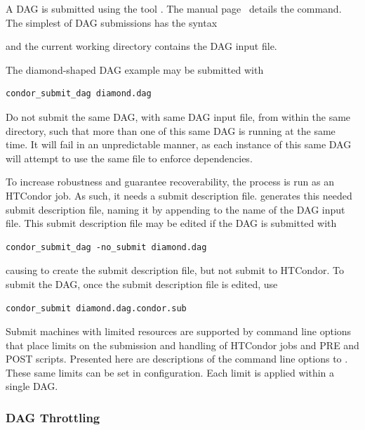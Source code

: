 A DAG is submitted using the tool .
The manual
page~\pageref{man-condor-submit-dag}
details the command.
The simplest of DAG submissions has the syntax

 

and the current working directory contains the DAG input file.

The diamond-shaped DAG example may be submitted with

\begin{verbatim}
condor_submit_dag diamond.dag
\end{verbatim}

Do not submit the same DAG, with same DAG input file, 
from within the same directory, 
such that more than one of this same DAG is running at the same time.
It will fail in an unpredictable manner,
as each instance of this same DAG will attempt to use the same
file to enforce dependencies.
 
To increase robustness and guarantee recoverability, the 
 process is run as an HTCondor job.
As such, it needs a submit description file.
 generates this needed submit description file,
naming it by appending  to the name of the DAG input file.
This submit description file may be edited if the DAG is submitted with

\begin{verbatim}
condor_submit_dag -no_submit diamond.dag
\end{verbatim}
causing  to create the submit description file,
but not submit  to HTCondor.
To submit the DAG, once the submit description file is edited,
use

\begin{verbatim}
condor_submit diamond.dag.condor.sub
\end{verbatim}

Submit machines with limited resources are supported by
command line options that place limits on the submission and handling 
of HTCondor jobs and PRE and POST scripts. 
Presented here are descriptions of the command line options
to .
These same limits can be set in configuration.
Each limit is applied within a single DAG.

\subsubsection{\label{sec:DAG-throttling}DAG Throttling}

